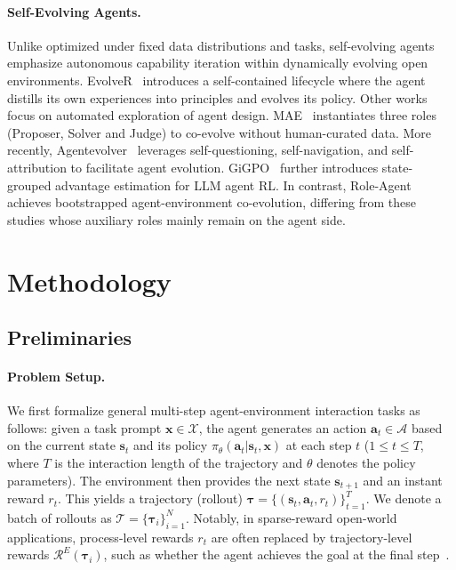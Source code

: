 \documentclass{llmxive}
\providecommand{\bm}[1]{\boldsymbol{#1}}
\begin{document}
\paragraph{Self-Evolving Agents.} Unlike optimized under fixed data distributions and tasks, self-evolving agents~\cite{gao2025survey,zhai2025agentevolver} emphasize autonomous capability iteration within dynamically evolving open environments. EvolveR~\cite{wu2025evolver} introduces a self-contained lifecycle where the agent distills its own experiences into principles and evolves its policy. Other works~\cite{hu2024automated,novikov2025alphaevolve} focus on automated exploration of agent design. MAE~\cite{chen2025multi} instantiates three roles (Proposer, Solver and Judge) to co-evolve without human-curated data. More recently, Agentevolver~\cite{zhai2025agentevolver} leverages self-questioning, self-navigation, and self-attribution to facilitate agent evolution. GiGPO~\cite{feng2025group} further introduces state-grouped advantage estimation for LLM agent RL. In contrast, Role-Agent achieves bootstrapped agent-environment co-evolution, differing from these studies whose auxiliary roles mainly remain on the agent side.

\section{Methodology}

\subsection{Preliminaries}
\paragraph{Problem Setup.} We first formalize general multi-step agent-environment interaction tasks as follows: given a task prompt $\bm{x}\in\mathcal{X}$, the agent generates an action $\bm{a}_t\in{\mathcal{A}}$ based on the current state $\bm{s}_t$ and its policy $\pi_\theta(\bm{a}_t|\bm{s}_t,\bm{x})$ at each step $t$ ($1\le t\le T$, where $T$ is the interaction length of the trajectory and $\theta$ denotes the policy parameters). The environment then provides the next state $\bm{s}_{t+1}$ and an instant reward $r_t$. This yields a trajectory (rollout) $\bm{\tau} = \{(\bm{s}_t,\bm{a}_t,r_t)\}_{t=1}^T$. We denote a batch of rollouts as $\mathcal{T} = \{\bm{\tau}_i\}_{i=1}^N$. Notably, in sparse-reward open-world applications, process-level rewards $r_t$ are often replaced by trajectory-level rewards $\mathcal{R}^E(\bm{\tau}_i)$, such as whether the agent achieves the goal at the final step~\cite{shridhar2020alfworld}. 
\end{document}

